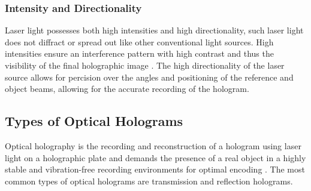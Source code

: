 \documentclass[12pt]{article}
\begin{document}
\subsubsection{Intensity and Directionality}

Laser light possesses both high intensities and high directionality, such laser light does not diffract or spread out like other conventional light sources.
High intensities ensure an interference pattern with high contrast and thus the visibility of the final holographic image \cite{kafri1990physics,haken1986laser}.
The high directionality of the laser source allows for percision over the angles and positioning of the reference and object beams, allowing for the accurate recording of the hologram.

\subsection{Types of Optical Holograms}

Optical holography is the recording and reconstruction of a hologram using laser light on a holographic plate and demands the presence of a real object in a highly stable and vibration-free
recording environments for optimal encoding \cite{basicholo1}.
The most common types of optical holograms are transmission and reflection holograms.
\end{document}
